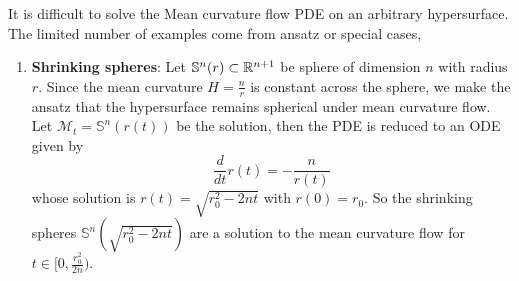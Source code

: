 It is difficult to solve the Mean curvature flow PDE on an arbitrary hypersurface. The limited number of examples come from ansatz or special cases,
\begin{enumerate}
    \item \textbf{Shrinking spheres}: Let $ \mathbb{S}^{n}(r) \subset \mathbb{R}^{n+1} $ be sphere of dimension $ n $ with radius $ r $. Since the mean curvature $ H = \frac{n}{r} $ is constant across the sphere, we make the ansatz that the hypersurface remains spherical under mean curvature flow. Let $ \mathcal{M}_{t} = \mathbb{S}^{n}(r(t)) $ be the solution, then the PDE is reduced to an ODE given by \begin{equation}
        \frac{d}{dt}r(t) = -\frac{n}{r(t)}
    \end{equation}
    whose solution is $ r(t) = \sqrt{r_{0}^{2}-2nt} $ with $ r(0)=r_{0} $. So the shrinking spheres $ \mathbb{S}^{n}(\sqrt{r_{0}^{2}-2nt})$ are a solution to the mean curvature flow for $ t \in [0,\frac{r_{0}^{2}}{2n}) $. 
    \begin{figure}[h]
        \centering
\end{figure}
\end{enumerate}
